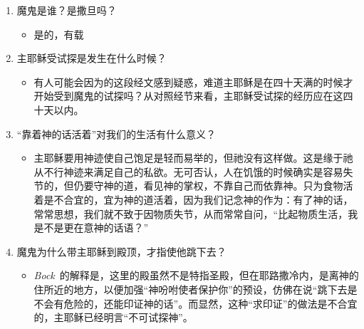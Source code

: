 \begin{enumerate}
  \item \label{cpt2:que:4}魔鬼是谁？是撒旦吗？
  \begin{itemize}
    \item 是的，有载
  \end{itemize}
  \item \label{cpt2:que:5}主耶稣受试探是发生在什么时候？
  \begin{itemize}
    \item 有人可能会因为的这段经文感到疑惑，难道主耶稣是在四十天满的时候才开始受到魔鬼的试探吗？从对照经节来看，主耶稣受试探的经历应在这四十天以内。
  \end{itemize}
  \item \label{cpt2:que:6}“靠着神的话活着”对我们的生活有什么意义？
  \begin{itemize}
    \item 主耶稣要用神迹使自己饱足是轻而易举的，但祂没有这样做。这是缘于祂从不行神迹来满足自己的私欲。无可否认，人在饥饿的时候确实是容易失节的，但仍要守神的道，看见神的掌权，不靠自己而依靠神。只为食物活着是不合宜的，宜为神的道活着，因为我们记念神的作为：有了神的话，常常思想，我们就不致于因物质失节，从而常常自问，“比起物质生活，我是不是更在意神的话语？”
  \end{itemize}
  \item \label{cpt2:que:7}魔鬼为什么带主耶稣到殿顶，才指使他跳下去？
  \begin{itemize}
    \item \textit{Bock}~\cite{book:bock1994luke}的解释是，这里的殿虽然不是特指圣殿，但在耶路撒冷内，是离神的住所近的地方，以便加强“神吩咐使者保护你”的预设，仿佛在说“跳下去是不会有危险的，还能印证神的话”。而显然，这种“求印证”的做法是不合宜的，主耶稣已经明言“不可试探神”。
  \end{itemize}
\end{enumerate}

\renewcommand{\bibname}{本章参考}


